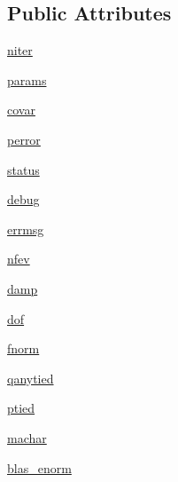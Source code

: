 \subsection*{Public Attributes}
\begin{DoxyCompactItemize}
\item 
\hyperlink{classmpfit_1_1mpfit_a0acb816b501c7c62de9b40d51ed3e019}{niter}
\item 
\hyperlink{classmpfit_1_1mpfit_aeeab3c562889cb4fe9d347eeb7e8b40e}{params}
\item 
\hyperlink{classmpfit_1_1mpfit_a6e2df0f73518da9c1bfb3b6c7049bf19}{covar}
\item 
\hyperlink{classmpfit_1_1mpfit_a7fd7c6e0276941f29ae138be862c05fa}{perror}
\item 
\hyperlink{classmpfit_1_1mpfit_a07bef52fd34a9c9d76d605d5d5ff6e6e}{status}
\item 
\hyperlink{classmpfit_1_1mpfit_a358f9f890ac24bb17cf324dd769a69cb}{debug}
\item 
\hyperlink{classmpfit_1_1mpfit_ae0e12388314fd29ceeada36c1f706f53}{errmsg}
\item 
\hyperlink{classmpfit_1_1mpfit_a4a63457ae8102a51227f7ebae4d1d63d}{nfev}
\item 
\hyperlink{classmpfit_1_1mpfit_aef26cc875dbd46374c00332953bb556e}{damp}
\item 
\hyperlink{classmpfit_1_1mpfit_a921637d44c54727c9434aada7f2fc8fb}{dof}
\item 
\hyperlink{classmpfit_1_1mpfit_a69fbce6bf57f692544b35f71d6ae1a07}{fnorm}
\item 
\hyperlink{classmpfit_1_1mpfit_a88c16eda6a0a5ddf3296b1b2d82eba06}{qanytied}
\item 
\hyperlink{classmpfit_1_1mpfit_a121863b0d2d0ffca2d375b7a6f19a567}{ptied}
\item 
\hyperlink{classmpfit_1_1mpfit_a3b940dde9105271118b2e88d9ed88740}{machar}
\item 
\hyperlink{classmpfit_1_1mpfit_ab275d6a4b396b11b4a21d9af891b385f}{blas\-\_\-enorm}
\end{DoxyCompactItemize}



